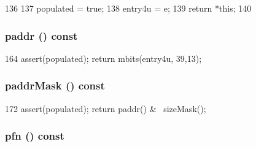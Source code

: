 \begin{DoxyCode}
136     {
137         populated = true;
138         entry4u = e;
139         return *this;
140     }
\end{DoxyCode}
\hypertarget{classSparcISA_1_1PageTableEntry_a26f24be1556c1c0ac2c42e1eff5e1197}{
\subsubsection[{paddr}]{ paddr () const}}
\label{classSparcISA_1_1PageTableEntry_a26f24be1556c1c0ac2c42e1eff5e1197}



\begin{DoxyCode}
164 { assert(populated); return mbits(entry4u, 39,13);}
\end{DoxyCode}
\hypertarget{classSparcISA_1_1PageTableEntry_a94d3e666f6695ace0b7398ebac2980cf}{
\subsubsection[{paddrMask}]{ paddrMask () const}}
\label{classSparcISA_1_1PageTableEntry_a94d3e666f6695ace0b7398ebac2980cf}



\begin{DoxyCode}
172 { assert(populated); return paddr() & ~sizeMask(); }
\end{DoxyCode}
\hypertarget{classSparcISA_1_1PageTableEntry_ae6bfcb957f6df6777f3294e78ac298af}{
\subsubsection[{pfn}]{ pfn () const}}
\label{classSparcISA_1_1PageTableEntry_ae6bfcb957f6df6777f3294e78ac298af}



